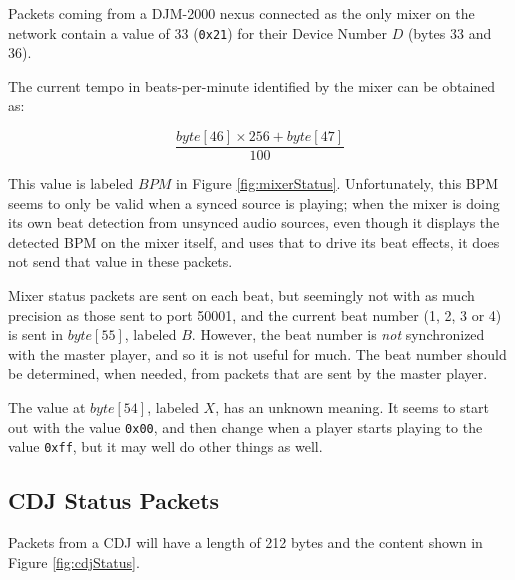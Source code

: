 \documentclass[11pt]{article}
\begin{document}
Packets coming from a DJM-2000 nexus connected as the only mixer on
the network contain a value of 33 ({\tt 0x21}) for their Device Number
$D$ (bytes 33 and 36).

The current tempo in beats-per-minute identified by the mixer can be
obtained as:

\[ \frac{byte[46] \times 256 + byte[47]}{100} \]

This value is labeled $BPM$ in Figure \ref{fig:mixerStatus}.
Unfortunately, this BPM seems to only be valid when a synced source is
playing; when the mixer is doing its own beat detection from unsynced
audio sources, even though it displays the detected BPM on the mixer
itself, and uses that to drive its beat effects, it does not send that
value in these packets.

Mixer status packets are sent on each beat, but seemingly not with as
much precision as those sent to port 50001, and the current beat
number (1, 2, 3 or 4) is sent in $byte[55]$, labeled $B$. However, the
beat number is \emph{not} synchronized with the master player, and so
it is not useful for much. The beat number should be determined, when
needed, from packets that are sent by the master player.

The value at $byte[54]$, labeled $X$, has an unknown meaning. It
seems to start out with the value {\tt 0x00}, and then change when a
player starts playing to the value {\tt 0xff}, but it may well do
other things as well.

\subsection{CDJ Status Packets}

Packets from a CDJ will have a length of 212 bytes and the content
shown in Figure \ref{fig:cdjStatus}.
\end{document}
